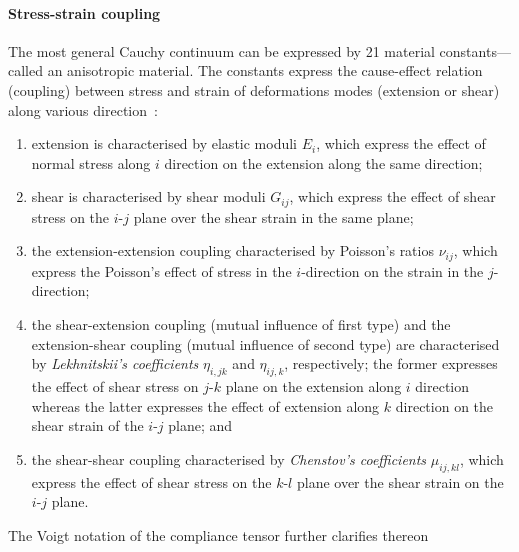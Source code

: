     \paragraph{Stress-strain coupling} The most general Cauchy continuum can be expressed by 21 material constants---called an anisotropic material. The constants express the cause-effect relation (coupling) between stress and strain of deformations modes (extension or shear) along various direction~\autocite{Lekhnitskii.1981,Vannucci.2018}:
    \begin{enumerate}
        \item extension is characterised by elastic moduli $E_{i}$, which express the effect of normal stress along $i$ direction on the extension along the same direction;
        \item shear is characterised by shear moduli $G_{ij}$, which express the effect of shear stress on the $i$-$j$ plane over the shear strain in the same plane; 
        \item the extension-extension coupling characterised by Poisson's ratios $\nu_{ij}$, which express the Poisson's effect of stress in the $i$-direction on the strain in the $j$-direction;
        \item the shear-extension coupling (mutual influence of first type) and the extension-shear coupling (mutual influence of second type) are characterised by \textit{Lekhnitskii's coefficients} $\eta_{i,jk}$ and $\eta_{ij,k}$, respectively; the former expresses the effect of shear stress on $j$-$k$ plane on the extension along $i$ direction whereas the latter expresses the effect of extension along $k$ direction on the shear strain of the $i$-$j$ plane; and
        \item the shear-shear coupling characterised by \textit{Chenstov's coefficients} $\mu_{ij,kl}$, which express the effect of shear stress on the $k$-$l$ plane over the shear strain on the $i$-$j$ plane.
    \end{enumerate}
    The Voigt notation of the compliance tensor further clarifies thereon
